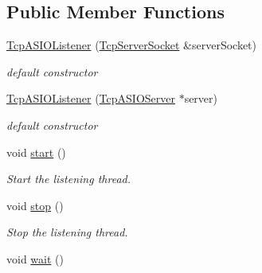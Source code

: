 \subsection*{Public Member Functions}
\begin{DoxyCompactItemize}
\item 
\hyperlink{classmognetwork_1_1_tcp_a_s_i_o_listener_aae7628471fda37905fab2dc03db11f77}{Tcp\-A\-S\-I\-O\-Listener} (\hyperlink{classmognetwork_1_1_tcp_server_socket}{Tcp\-Server\-Socket} \&server\-Socket)
\begin{DoxyCompactList}\small\item\em default constructor \end{DoxyCompactList}\item 
\hyperlink{classmognetwork_1_1_tcp_a_s_i_o_listener_a4c2dde59f70a3cd6d45f530a1c54b56c}{Tcp\-A\-S\-I\-O\-Listener} (\hyperlink{classmognetwork_1_1_tcp_a_s_i_o_server}{Tcp\-A\-S\-I\-O\-Server} $\ast$server)
\begin{DoxyCompactList}\small\item\em default constructor \end{DoxyCompactList}\item 
\hypertarget{classmognetwork_1_1_tcp_a_s_i_o_listener_afd805699dfe27ceb0541feeefacc13dc}{void \hyperlink{classmognetwork_1_1_tcp_a_s_i_o_listener_afd805699dfe27ceb0541feeefacc13dc}{start} ()}\label{classmognetwork_1_1_tcp_a_s_i_o_listener_afd805699dfe27ceb0541feeefacc13dc}

\begin{DoxyCompactList}\small\item\em Start the listening thread. \end{DoxyCompactList}\item 
\hypertarget{classmognetwork_1_1_tcp_a_s_i_o_listener_ac9952961dce0f44bc720485a4e4e620d}{void \hyperlink{classmognetwork_1_1_tcp_a_s_i_o_listener_ac9952961dce0f44bc720485a4e4e620d}{stop} ()}\label{classmognetwork_1_1_tcp_a_s_i_o_listener_ac9952961dce0f44bc720485a4e4e620d}

\begin{DoxyCompactList}\small\item\em Stop the listening thread. \end{DoxyCompactList}\item 
\hypertarget{classmognetwork_1_1_tcp_a_s_i_o_listener_ae6327f6471291ba5107c0a9c3362b929}{void \hyperlink{classmognetwork_1_1_tcp_a_s_i_o_listener_ae6327f6471291ba5107c0a9c3362b929}{wait} ()}\label{classmognetwork_1_1_tcp_a_s_i_o_listener_ae6327f6471291ba5107c0a9c3362b929}


\end{DoxyCompactItemize}
